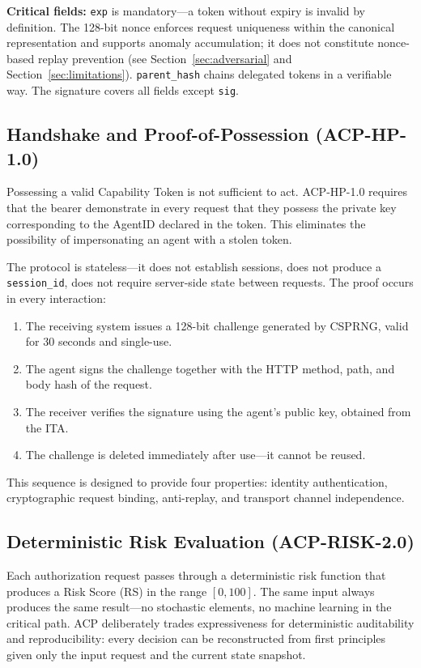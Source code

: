 \documentclass[11pt]{article}
\theoremstyle{definition}
\begin{document}
\textbf{Critical fields:}
\texttt{exp} is mandatory---a token without expiry is invalid by definition.
The 128-bit nonce enforces request uniqueness within the canonical representation and
supports anomaly accumulation; it does not constitute nonce-based replay prevention
(see Section~\ref{sec:adversarial} and Section~\ref{sec:limitations}).
\texttt{parent\_hash} chains delegated tokens in a verifiable way.
The signature covers all fields except \texttt{sig}.

\subsection{Handshake and Proof-of-Possession (ACP-HP-1.0)}

Possessing a valid Capability Token is not sufficient to act.
ACP-HP-1.0 requires that the bearer demonstrate in every request that they possess the private key corresponding to the AgentID declared in the token.
This eliminates the possibility of impersonating an agent with a stolen token.

The protocol is stateless---it does not establish sessions, does not produce a \texttt{session\_id}, does not require server-side state between requests. The proof occurs in every interaction:

\begin{enumerate}[noitemsep]
  \item The receiving system issues a 128-bit challenge generated by CSPRNG, valid for 30 seconds and single-use.
  \item The agent signs the challenge together with the HTTP method, path, and body hash of the request.
  \item The receiver verifies the signature using the agent's public key, obtained from the ITA.
  \item The challenge is deleted immediately after use---it cannot be reused.
\end{enumerate}

This sequence is designed to provide four properties:
identity authentication, cryptographic request binding, anti-replay, and transport channel independence.

\subsection{Deterministic Risk Evaluation (ACP-RISK-2.0)}

Each authorization request passes through a deterministic risk function that produces a Risk Score (RS) in the range $[0, 100]$.
The same input always produces the same result---no stochastic elements, no machine learning in the critical path.
ACP deliberately trades expressiveness for deterministic auditability and reproducibility: every decision can be reconstructed from first principles given only the input request and the current state snapshot.
\end{document}
